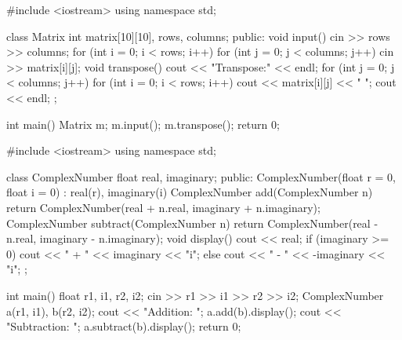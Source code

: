 
\outputlabel
{}


\codelabel

\begin{code}
#include <iostream>
using namespace std;

class Matrix {
    int matrix[10][10], rows, columns;
public:
    void input() {
        cin >> rows >> columns;
        for (int i = 0; i < rows; i++)
            for (int j = 0; j < columns; j++) cin >> matrix[i][j];
    }
    void transpose() {
        cout << "Transpose:" << endl;
        for (int j = 0; j < columns; j++) {
            for (int i = 0; i < rows; i++) cout << matrix[i][j] << " ";
            cout << endl;
        }
    }
};

int main() {
    Matrix m; m.input(); m.transpose();
    return 0;
}
\end{code}

\outputlabel
{}


\codelabel

\begin{code}
#include <iostream>
using namespace std;

class ComplexNumber {
    float real, imaginary;
public:
    ComplexNumber(float r = 0, float i = 0) : real(r), imaginary(i) {}
    ComplexNumber add(ComplexNumber n) { return ComplexNumber(real + n.real, imaginary + n.imaginary); }
    ComplexNumber subtract(ComplexNumber n) { return ComplexNumber(real - n.real, imaginary - n.imaginary); }
    void display() {
        cout << real;
        if (imaginary >= 0) cout << " + " << imaginary << "i\n";
        else cout << " - " << -imaginary << "i\n";
    }
};

int main() {
    float r1, i1, r2, i2;
    cin >> r1 >> i1 >> r2 >> i2;
    ComplexNumber a(r1, i1), b(r2, i2);
    cout << "Addition: "; a.add(b).display();
    cout << "Subtraction: "; a.subtract(b).display();
    return 0;
}
\end{code}

